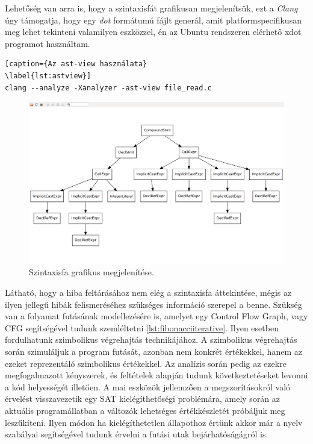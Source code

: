 \documentclass[a4paper,12pt]{report}
\begin{document}
Lehetőség van arra is, hogy a szintaxisfát grafikusan megjelenítsük, ezt a \emph{Clang} úgy támogatja, hogy egy \emph{dot} formátumú fájlt generál, amit platformspecifikusan meg lehet tekinteni valamilyen eszközzel, én az Ubuntu rendszeren elérhető xdot programot használtam.
\begin{lstlisting}[caption={Az ast-view használata}
\label{lst:astview}]
clang --analyze -Xanalyzer -ast-view file_read.c
\end{lstlisting}

\begin{figure}[h]
\caption{Szintaxisfa grafikus megjelenítése.}
\centering
\includegraphics[scale=0.2]{astview.png}
\end{figure}

Látható, hogy a hiba feltárásához nem elég a szintaxisfa áttekintése, mégis az ilyen jellegű hibák felismeréséhez szükséges információ szerepel a benne. Szükség van a folyamat futásának modellezésére is, amelyet egy Control Flow Graph, vagy CFG segítségével tudunk szemléltetni \ref{lst:fibonacciiterative}. Ilyen esetben fordulhatunk szimbolikus végrehajtás technikájához. A szimbolikus végrehajtás során szimuláljuk a program futását, azonban nem konkrét értékekkel, hanem az ezeket reprezentáló szimbolikus értékekkel. Az analízis során pedig az ezekre megfogalmazott kényszerek, és feltételek alapján tudunk következtetéseket levonni a kód helyességét illetően. A mai eszközök jellemzően a megszorításokról való érvelést visszavezetik egy SAT kielégíthetőségi problémára, amely során az aktuális programállatban a változók lehetséges értékkészletét próbáljuk meg leszűkíteni. Ilyen módon ha kielégíthetetlen állapothoz értünk akkor már a nyelv szabályai segítségével tudunk érvelni a futási utak bejárhatóságágról is.
\end{document}
